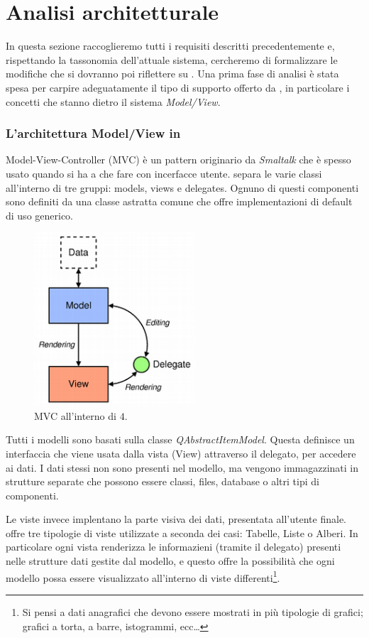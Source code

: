 \section{Analisi architetturale}
In questa sezione raccoglieremo tutti i requisiti descritti precedentemente e, rispettando la tassonomia dell'attuale sistema, cercheremo di formalizzare le modifiche che si dovranno poi riflettere su \visualnetkit{}. Una prima fase di analisi è stata spesa per carpire adeguatamente il tipo di supporto offerto da \qt{}, in particolare i concetti che stanno dietro il sistema \emph{Model/View}.

\subsubsection*{L'architettura Model/View in \qt{}}
Model-View-Controller (MVC) è un pattern originario da \emph{Smaltalk} che è spesso usato quando si ha a che fare con incerfacce utente. \qt{} separa le varie classi all'interno di tre gruppi: models, views e delegates. Ognuno di questi componenti sono definiti da una classe astratta comune che offre implementazioni di default di uso generico.

\begin{figure}[!htb]
	\centering
	\includegraphics[width=6cm]{images/modelview-overview.png}
	\caption{MVC all'interno di \qt{}$4$.}
	\label{figura:qt_mvc}
\end{figure}

Tutti i modelli sono basati sulla classe \emph{QAbstractItemModel}. Questa definisce un interfaccia che viene usata dalla vista (View) attraverso il delegato, per accedere ai dati. I dati stessi non sono presenti nel modello, ma vengono immagazzinati in strutture separate che possono essere classi, files, database o altri tipi di componenti.

Le viste invece implentano la parte visiva dei dati, presentata all'utente finale. \qt{} offre tre tipologie di viste utilizzate a seconda dei casi: Tabelle, Liste o Alberi. In particolare ogni vista renderizza le informazieni (tramite il delegato) presenti nelle strutture dati gestite dal modello, e questo offre la possibilità che ogni modello possa essere visualizzato all'interno di viste differenti\footnote{Si pensi a dati anagrafici che devono essere mostrati in più tipologie di grafici; grafici a torta, a barre, istogrammi, ecc\ldots}.

